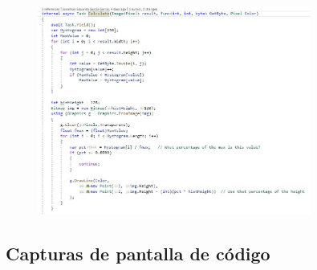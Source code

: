 \documentclass[conference]{IEEEtran}
\begin{document}
\begin{figure}[h!]
    \centering
    \includegraphics[width=9cm]{codeC3.jpg}
\end{figure}

\newpage
\subsection{Capturas de pantalla de código}
\end{document}

